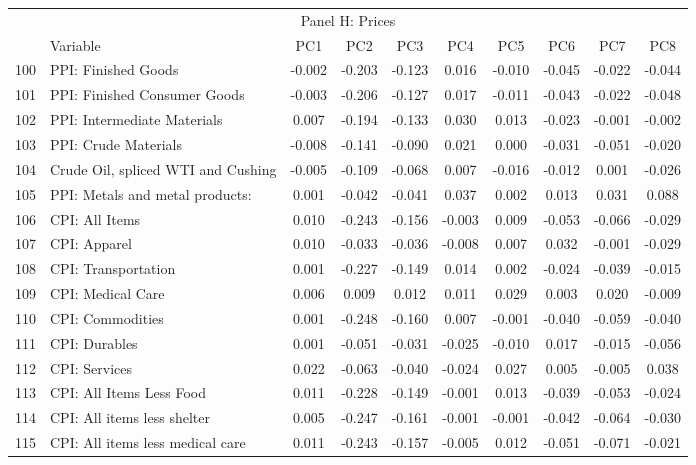 \newpage
\vspace*{250px}
\begin{table}[!h]
\scriptsize
    \centering
    \begin{tabular}{llcccccccc}
    \hline
 \multicolumn{10}{c}{Panel H: Prices} \\ 
&Variable&	PC1	&	PC2	&	PC3	&	PC4	&	PC5	&	PC6	&	PC7	&	PC8	\\ \hline
100&PPI: Finished Goods	&	-0.002	&	-0.203	&	-0.123	&	0.016	&	-0.010	&	-0.045	&	-0.022	&	-0.044	\\
101&PPI: Finished Consumer Goods	&	-0.003	&	-0.206	&	-0.127	&	0.017	&	-0.011	&	-0.043	&	-0.022	&	-0.048	\\
102&PPI: Intermediate Materials	&	0.007	&	-0.194	&	-0.133	&	0.030	&	0.013	&	-0.023	&	-0.001	&	-0.002	\\
103&PPI: Crude Materials	&	-0.008	&	-0.141	&	-0.090	&	0.021	&	0.000	&	-0.031	&	-0.051	&	-0.020	\\
104&Crude Oil, spliced WTI and Cushing	&	-0.005	&	-0.109	&	-0.068	&	0.007	&	-0.016	&	-0.012	&	0.001	&	-0.026	\\
105&PPI: Metals and metal products:	&	0.001	&	-0.042	&	-0.041	&	0.037	&	0.002	&	0.013	&	0.031	&	0.088	\\
106&CPI: All Items	&	0.010	&	-0.243	&	-0.156	&	-0.003	&	0.009	&	-0.053	&	-0.066	&	-0.029	\\
107&CPI: Apparel	&	0.010	&	-0.033	&	-0.036	&	-0.008	&	0.007	&	0.032	&	-0.001	&	-0.029	\\
108&CPI: Transportation	&	0.001	&	-0.227	&	-0.149	&	0.014	&	0.002	&	-0.024	&	-0.039	&	-0.015	\\
109&CPI: Medical Care	&	0.006	&	0.009	&	0.012	&	0.011	&	0.029	&	0.003	&	0.020	&	-0.009	\\
110&CPI: Commodities	&	0.001	&	-0.248	&	-0.160	&	0.007	&	-0.001	&	-0.040	&	-0.059	&	-0.040	\\
111&CPI: Durables	&	0.001	&	-0.051	&	-0.031	&	-0.025	&	-0.010	&	0.017	&	-0.015	&	-0.056	\\
112&CPI: Services	&	0.022	&	-0.063	&	-0.040	&	-0.024	&	0.027	&	0.005	&	-0.005	&	0.038	\\
113&CPI: All Items Less Food	&	0.011	&	-0.228	&	-0.149	&	-0.001	&	0.013	&	-0.039	&	-0.053	&	-0.024	\\
114&CPI: All items less shelter	&	0.005	&	-0.247	&	-0.161	&	-0.001	&	-0.001	&	-0.042	&	-0.064	&	-0.030	\\
115&CPI: All items less medical care	&	0.011	&	-0.243	&	-0.157	&	-0.005	&	0.012	&	-0.051	&	-0.071	&	-0.021	\\

\end{tabular}
\end{table}
